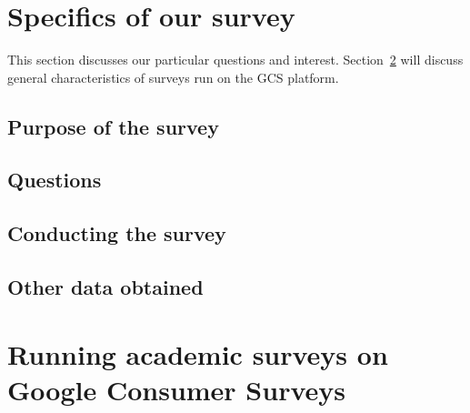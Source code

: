 \documentclass[12pt,titlepage]{article}
\date{\myversion
}
\title{\mytitle}
\author{Lars Vilhuber}
\begin{document}
 \maketitle



	\thispagestyle{empty}
	\singlespacing
%		
	
	 \newpage
	 \setcounter{page}{1}
\section{Specifics of our survey}
This section discusses our particular questions and interest. Section~\ref{sec:general_gcs} will discuss general characteristics of surveys run on the \ac{GCS} platform.

\subsection{Purpose of the survey}
\label{sec:intro}



\subsection{Questions}
\label{sec:questions}

\clearpage

\subsection{Conducting the survey}
\label{sec:conducting_specifics}


\subsection{Other data obtained}
\label{sec:data}


\section{Running academic surveys on Google Consumer Surveys}
\label{sec:general_gcs}
\end{document}
